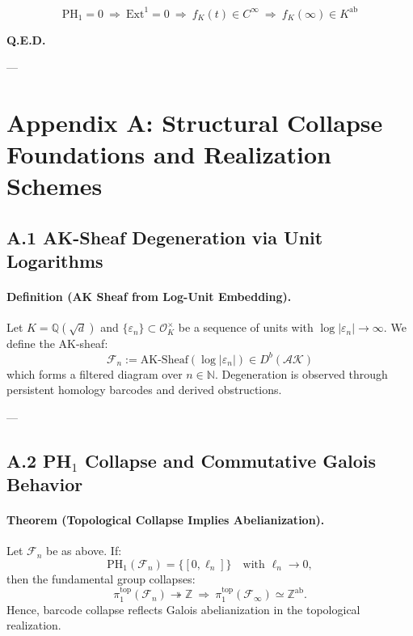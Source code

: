 \documentclass[11pt]{article}
\begin{document}
\[
\boxed{
\mathrm{PH}_1 = 0 \ \Rightarrow\ \mathrm{Ext}^1 = 0 \ \Rightarrow\ f_K(t) \in C^\infty \ \Rightarrow\ f_K(\infty) \in K^{\mathrm{ab}}
}
\]

\begin{center}
\LARGE \textbf{Q.E.D.}
\end{center}


---


\appendix
\section*{Appendix A: Structural Collapse Foundations and Realization Schemes}

\subsection*{A.1 AK-Sheaf Degeneration via Unit Logarithms}

\paragraph{Definition (AK Sheaf from Log-Unit Embedding).}
Let \( K = \mathbb{Q}(\sqrt{d}) \) and \( \{ \varepsilon_n \} \subset \mathcal{O}_K^\times \) be a sequence of units with \( \log|\varepsilon_n| \to \infty \).  
We define the AK-sheaf:
\[
\mathcal{F}_n := \mathrm{AK}\text{-}\mathrm{Sheaf}(\log|\varepsilon_n|) \in D^b(\mathcal{AK})
\]
which forms a filtered diagram over \( n \in \mathbb{N} \).  
Degeneration is observed through persistent homology barcodes and derived obstructions.

---

\subsection*{A.2 PH$_1$ Collapse and Commutative Galois Behavior}

\paragraph{Theorem (Topological Collapse Implies Abelianization).}
Let \( \mathcal{F}_n \) be as above. If:
\[
\mathrm{PH}_1(\mathcal{F}_n) = \{[0, \ell_n]\} \quad \text{with } \ell_n \to 0,
\]
then the fundamental group collapses:
\[
\pi_1^{\mathrm{top}}(\mathcal{F}_n) \twoheadrightarrow \mathbb{Z} \ \Rightarrow\ \pi_1^{\mathrm{top}}(\mathcal{F}_\infty) \simeq \mathbb{Z}^{\mathrm{ab}}.
\]
Hence, barcode collapse reflects Galois abelianization in the topological realization.
\end{document}
